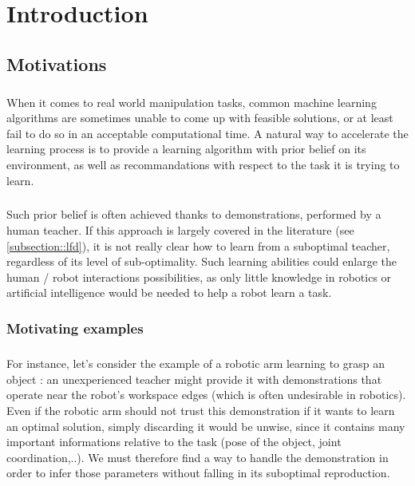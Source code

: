 \documentclass[a4paper]{report}
\begin{document}
	
	
	\tableofcontents

	
	\chapter{Introduction}
	{
		\section{Motivations}
		{
			\paragraph{} When it comes to real world manipulation tasks, common machine learning algorithms are sometimes unable to come up with feasible solutions, or at least fail to do so in an acceptable computational time. A natural way to accelerate the learning process is to provide a learning algorithm with prior belief on its environment, as well as recommandations with respect to the task it is trying to learn. 
			
			\paragraph{} Such prior belief is often achieved thanks to demonstrations, performed by a human teacher. If this approach is largely covered in the literature (see \ref{subsection::lfd}), it is not really clear how to learn from a suboptimal teacher, regardless of its level of sub-optimality. Such learning abilities could enlarge the human / robot interactions possibilities, as only little knowledge in robotics or artificial intelligence would be needed to help a robot learn a task. 
			
			\subsection{Motivating examples}
			\paragraph{} For instance, let's consider the example of a robotic arm learning to grasp an object : an unexperienced teacher might provide it with demonstrations that operate near the robot's workspace edges (which is often undesirable in robotics). Even if the robotic arm should not trust this demonstration if it wants to learn an optimal solution, simply discarding it would be unwise, since it contains many important informations relative to the task (pose of the object, joint coordination,..). We must therefore find a way to handle the demonstration in order to infer those parameters without falling in its suboptimal reproduction. 
			
}}
\end{document}
